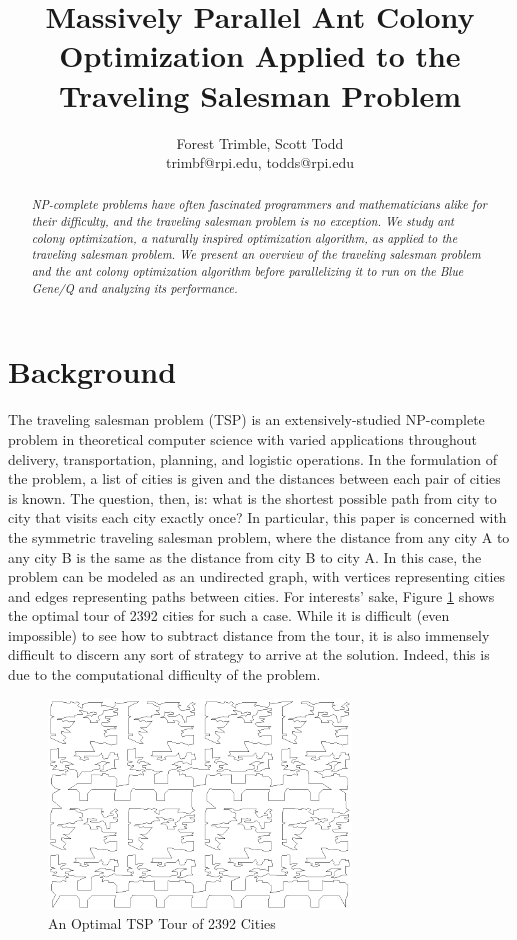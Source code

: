 \documentclass[twocolumn]{article}
\title{Massively Parallel Ant Colony Optimization Applied to the Traveling Salesman Problem}
\author{Forest Trimble, Scott Todd\\trimbf@rpi.edu, todds@rpi.edu}
\begin{document}
\maketitle

\pagestyle{fancy}
\fancyhead{}
\fancyhead[R]{\today}


\begin{abstract}
  \emph{NP-complete problems have often fascinated programmers and mathematicians alike
  for their difficulty, and the traveling salesman problem is no exception. We 
  study ant colony optimization, a naturally inspired optimization algorithm,
  as applied to the traveling salesman problem. We present an overview of
  the traveling salesman problem and the ant colony optimization algorithm before
  parallelizing it to run on the Blue Gene/Q and analyzing its performance. }
\end{abstract}

\section{Background} \label{sec:tsp}

The traveling salesman problem (TSP) is an extensively-studied NP-complete problem 
in theoretical computer science with varied applications throughout delivery, 
transportation, planning, and logistic operations. In the formulation of the 
problem, a list of cities is given and the distances between each pair of cities
is known. The question, then, is: what is the shortest possible path from city to
city that visits each city exactly once? In particular, this paper 
is concerned with the symmetric
traveling salesman problem, where the distance from any city A to any city B
is the same as the distance from city B to city A. In this case, the problem
can be modeled as an undirected graph, with vertices representing cities and
edges representing paths between cities. For interests' sake, Figure \ref{fig:opt2392}
shows the optimal tour of 2392 cities for such a case. While it is difficult 
(even impossible) to see how to subtract distance from the tour, it is also 
immensely difficult to discern any sort of strategy to arrive at the solution. 
Indeed, this is due to the computational difficulty of the problem.

\begin{figure}
  \centering
  \includegraphics[height=2.2in]{plots/pr2392.eps}
  \caption{An Optimal TSP Tour of 2392 Cities} \label{fig:opt2392}
\end{figure}
\end{document}
